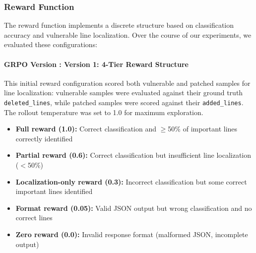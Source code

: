 \documentclass[12pt,a4paper]{article}
\makeatletter
\newcounter{GRPOVer}
\newcommand{\grpoversion}[2]{%
  \stepcounter{GRPOVer}%
  \paragraph{GRPO Version \theGRPOVer: #1}%
  \protected@edef\@currentlabel{\theGRPOVer}\label{#2}%
}
\makeatother
\begin{document}
\subsubsection{Reward Function}
The reward function implements a discrete structure based on classification accuracy and vulnerable line localization. Over the course of our experiments, we evaluated these configurations:

\grpoversion{Version 1: 4-Tier Reward Structure}{ver:grpo_4tier}
This initial reward configuration scored both vulnerable and patched samples for line localization: vulnerable samples were evaluated against their ground truth \texttt{deleted\_lines}, while patched samples were scored against their \texttt{added\_lines}. The rollout temperature was set to 1.0 for maximum exploration.
\begin{itemize}
\item \textbf{Full reward (1.0):} Correct classification and $\geq$50\% of important lines correctly identified
\item \textbf{Partial reward (0.6):} Correct classification but insufficient line localization ($<$50\%)
\item \textbf{Localization-only reward (0.3):} Incorrect classification but some correct important lines identified
\item \textbf{Format reward (0.05):} Valid JSON output but wrong classification and no correct lines
\item \textbf{Zero reward (0.0):} Invalid response format (malformed JSON, incomplete output)
\end{itemize}
\end{document}
